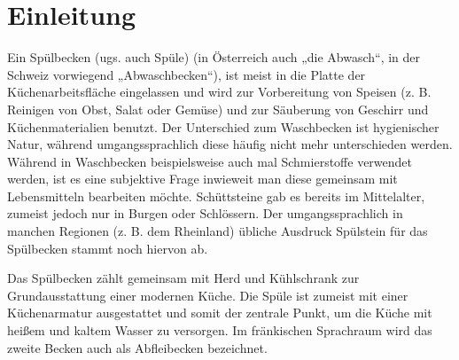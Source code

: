 
\chapter{Einleitung}
Ein Spülbecken (ugs. auch Spüle) (in Österreich auch „die Abwasch“, in der Schweiz vorwiegend „Abwaschbecken“), ist meist in die Platte der Küchenarbeitsfläche eingelassen und wird zur Vorbereitung von Speisen (z. B. Reinigen von Obst, Salat oder Gemüse) und zur Säuberung von Geschirr und Küchenmaterialien benutzt. Der Unterschied zum Waschbecken ist hygienischer Natur, während umgangssprachlich diese häufig nicht mehr unterschieden werden. Während in Waschbecken beispielsweise auch mal Schmierstoffe verwendet werden, ist es eine subjektive Frage inwieweit man diese gemeinsam mit Lebensmitteln bearbeiten möchte. Schüttsteine gab es bereits im Mittelalter, zumeist jedoch nur in Burgen oder Schlössern. Der umgangssprachlich in manchen Regionen (z. B. dem Rheinland) übliche Ausdruck Spülstein für das Spülbecken stammt noch hiervon ab.

Das Spülbecken zählt gemeinsam mit Herd und Kühlschrank zur Grundausstattung einer modernen Küche. Die Spüle ist zumeist mit einer Küchenarmatur ausgestattet und somit der zentrale Punkt, um die Küche mit heißem und kaltem Wasser zu versorgen. Im fränkischen Sprachraum wird das zweite Becken auch als Abfleibecken bezeichnet.

